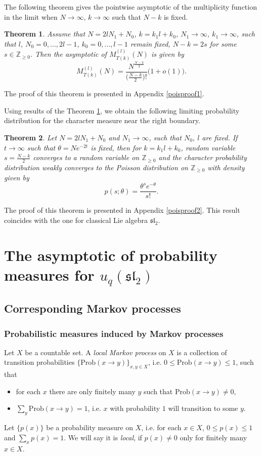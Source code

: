 \documentclass[11pt]{amsart}
\newcommand\lie[1]{\mathfrak{#1}}
\newtheorem{theorem}{Theorem}[section]
\begin{document}
The following theorem gives the pointwise asymptotic of the multiplicity function in the limit when $N\to\infty$, $k\to\infty$ such that $N-k$ is fixed.
\begin{theorem}\label{multdrift}
    Assume that $N=2lN_1+N_0$, $k=k_1l+k_0$, $N_1\to\infty$, $k_1\to\infty$, such that $l$, $N_0=0,\dots,2l-1$, $k_0=0,\dots,l-1$ remain fixed, $N-k=2s$ for some $s\in\mathbb{Z}_{\geq 0}$. Then the asymptotic of $M^{(l)}_{T(k)}(N)$ is given by
	\begin{equation*}
	M^{(l)}_{T(k)}(N)=\frac{N^\frac{N-k}{2}}{\big(\frac{N-k}{2}\big)!}\Big(1+o(1)\Big).
	\end{equation*}
\end{theorem}
The proof of this theorem is presented in Appendix \ref{poisproof1}.


Using results of the Theorem \ref{multdrift}, we obtain the following limiting probability distribution for the character measure near the right boundary.
\begin{theorem}\label{mesdrift}
    Let $N=2lN_1+N_0$ and $N_1\to\infty$, such that $N_0$, $l$ are fixed. If $t\to\infty$ such that $\theta=Ne^{-2t}$ is fixed, then for $k=k_1l+k_0$, random variable $s=\frac{N-k}{2}$ converges to a random variable on $\mathbb{Z}_{\geq 0}$ and the character probability distribution weakly converges to the Poisson distribution on $\mathbb{Z}_{\geq 0}$ with density given by
	\begin{equation*}
	p(s;\theta)=\frac{\theta^{s}e^{-\theta}}{s!}.
	\end{equation*}
\end{theorem}
The proof of this theorem is presented in Appendix \ref{poisproof2}.
This result coincides with the one for classical Lie algebra $\lie{sl}_2$.



\section{The asymptotic of probability measures for $u_q(\lie{sl}_2)$}\label{as10}
\subsection{Corresponding Markov processes}
\subsubsection{Probabilistic measures induced by Markov processes}
Let $X$ be a countable set. A {\it local Markov process} on $X$ is a collection of transition probabilities $\{\mathrm{Prob}(x\to y)\}_{x,y\in X}$, i.e. $0\leq \mathrm{Prob}(x\to y)\leq 1$, such that
\begin{itemize}
\item for each $x$ there are only finitely many $y$ such that $\mathrm{Prob}(x\to y)\neq 0$,
\item $\sum\limits_y \mathrm{Prob}(x\to y)=1$, i.e. $x$ with probability $1$ will transition to some $y$. 
\end{itemize}
Let $\{p(x)\}$ be a probability measure on $X$, i.e. for each $x\in X$, $0\leq p(x) \leq 1$ and $\sum\limits_x p(x)=1$. We will say it is {\it local}, if $p(x)\neq 0$ only for finitely many $x\in X$. 
\end{document}
